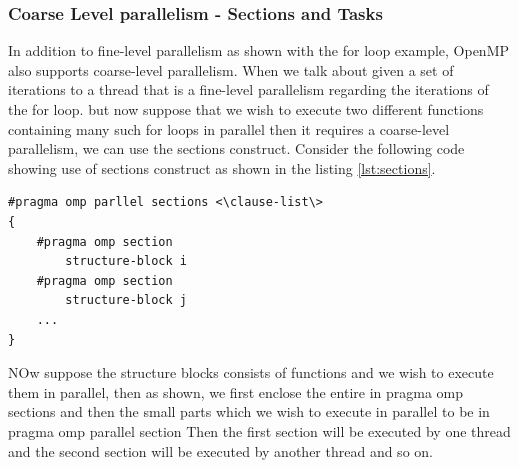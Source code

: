 \documentclass[12pt]{book}
\begin{document}
\subsubsection{Coarse Level parallelism - Sections and Tasks}
In addition to fine-level parallelism as shown with the for loop example, OpenMP also supports coarse-level parallelism.
When we talk about given a set of iterations to a thread that is a fine-level parallelism regarding the iterations of the for loop.
but now suppose that we wish to execute two different functions containing many such for loops in parallel then it requires a coarse-level parallelism, we can use the sections construct.
Consider the following code showing use of sections construct as shown in the listing \ref{lst:sections}.
\begin{lstlisting}[caption={Sections Construct},captionpos=b,label={lst:sections}]
#pragma omp parllel sections <\clause-list\>
{
    #pragma omp section
        structure-block i
    #pragma omp section
        structure-block j
    ...
}
\end{lstlisting}
NOw suppose the structure blocks consists of functions and we wish to execute them in parallel, then as shown, we first enclose the entire in pragma omp sections and then 
the small parts which we wish to execute in parallel to be in pragma omp parallel section
Then the first section will be executed by one thread and the second section will be executed by another thread and so on.
\end{document}
